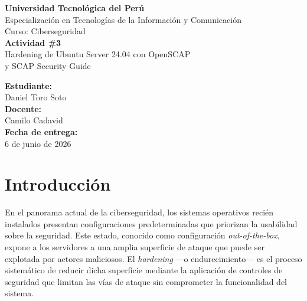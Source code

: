 \documentclass[12pt,letterpaper]{article}
\begin{document}
\begin{titlepage}
  \centering
  \vspace*{1cm}

  {\large\bfseries Universidad Tecnológica del Perú}\\[0.3cm]
  {\large Especialización en Tecnologías de la Información y Comunicación}\\[0.2cm]
  {\large Curso: Ciberseguridad}\\[3cm]

  {\LARGE\bfseries Actividad \#3}\\[0.5cm]
  {\Large Hardening de Ubuntu Server 24.04 con OpenSCAP\\
  y SCAP Security Guide}\\[3cm]

  \begin{flushleft}
    {\large\bfseries Estudiante:}\\[0.2cm]
    {\large Daniel Toro Soto}\\[1cm]
    {\large\bfseries Docente:}\\[0.2cm]
    {\large Camilo Cadavid}\\[1cm]
    {\large\bfseries Fecha de entrega:}\\[0.2cm]
    {\large 6 de junio de 2026}
  \end{flushleft}

  \vfill
\end{titlepage}

\tableofcontents
\newpage

\section{Introducción}

En el panorama actual de la ciberseguridad, los sistemas operativos recién instalados presentan configuraciones predeterminadas que priorizan la usabilidad sobre la seguridad. Este estado, conocido como configuración \textit{out-of-the-box}, expone a los servidores a una amplia superficie de ataque que puede ser explotada por actores maliciosos. El \textit{hardening} —o endurecimiento— es el proceso sistemático de reducir dicha superficie mediante la aplicación de controles de seguridad que limitan las vías de ataque sin comprometer la funcionalidad del sistema.
\end{document}
